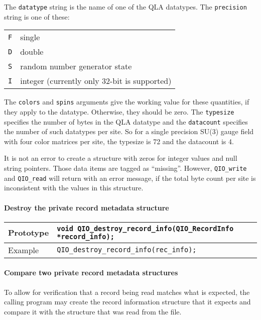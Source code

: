 \documentclass{article}
\begin{document}
The \verb|datatype| string is the name of one of the QLA datatypes.
The \verb|precision| string is one of these:
%
\begin{flushleft}
  \begin{tabular}{|l|l|}
\hline
    \verb|F| & single \\
    \verb|D| & double \\
    \verb|S| & random number generator state \\
    \verb|I| & integer (currently only 32-bit is supported)\\
\hline
  \end{tabular}
\end{flushleft}
%
The \verb|colors| and \verb|spins| arguments give the working value
for these quantities, if they apply to the datatype.  Otherwise, they
should be zero.  The \verb|typesize| specifies the number of bytes in
the QLA datatype and the \verb|datacount| specifies the number of such
datatypes per site.  So for a single precision SU(3) gauge field with
four color matrices per site, the typesize is 72 and the datacount is
4.

It is not an error to create a structure with zeros for integer values
and null string pointers.  Those data items are tagged as ``missing''.
However, \verb|QIO_write| and \verb|QIO_read| will return with an
error message, if the total byte count per site is inconsistent with
the values in this structure.

\paragraph{Destroy the private record metadata structure}
%
\begin{flushleft}
  \begin{tabular}{|l|l|}
  \hline
  Prototype      & \verb|void QIO_destroy_record_info(QIO_RecordInfo *record_info);| \\
\hline
  Example  & \verb|QIO_destroy_record_info(rec_info);|\\
   \hline
 \end{tabular}
\end{flushleft}
%

\paragraph{Compare two private record metadata structures}
To allow for verification that a record being read matches what is
expected, the calling program may create the record information
structure that it expects and compare it with the structure that
was read from the file.
\end{document}
